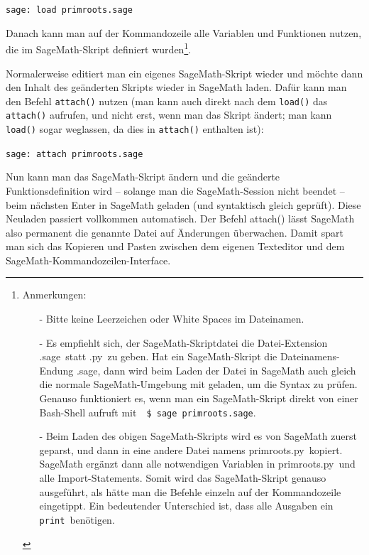 \texttt{sage: load primroots.sage}

Danach kann man auf der Kommandozeile alle Variablen und Funktionen
nutzen, die im Sage\-Math-Skript definiert wurden\footnote{%
Anmerkungen:
\begin{itemize}
\item[-]
Bitte keine Leerzeichen
oder White Spaces im Dateinamen.
\item[-]Es empfiehlt sich,
der SageMath-Skriptdatei die Datei-Extension
\glqq .sage\grqq~statt \glqq .py\grqq~zu geben.
Hat ein SageMath-Skript die Dateinamens-Endung \glqq .sage\grqq, dann wird
beim Laden der Datei in SageMath auch gleich die normale SageMath-Umgebung mit geladen,
um die Syntax zu prüfen. Genauso funktioniert es, wenn man ein SageMath-Skript direkt
von einer Bash-Shell aufruft mit~~\texttt{\$ sage primroots.sage}.
\item[-]Beim Laden des obigen
SageMath-Skripts wird es von SageMath zuerst geparst, und dann
in eine andere Datei namens \glqq primroots.py\grqq~kopiert. SageMath ergänzt
dann alle notwendigen Variablen in \glqq primroots.py\grqq~und alle Import-Statements.
Somit wird das SageMath-Skript genauso ausgeführt, als hätte man die Befehle einzeln
auf der Kommandozeile eingetippt. Ein bedeutender Unterschied ist,
dass alle Ausgaben ein \verb!print!~benötigen.
\end{itemize}
}.

Normalerweise editiert man ein eigenes SageMath-Skript wieder und möchte dann den
Inhalt des geänderten Skripts wieder in SageMath laden. Dafür kann man den Befehl
\verb!attach()! nutzen (man kann auch direkt nach dem \verb!load()!
das \verb!attach()! aufrufen, und nicht erst, wenn man das Skript ändert;
man kann \verb!load()! sogar weglassen, da dies in \verb!attach()! enthalten ist):

\texttt{sage: attach primroots.sage}

Nun kann man das SageMath-Skript ändern und die geänderte Funktionsdefinition
wird -- solange man die SageMath-Session nicht beendet -- beim nächsten Enter
in SageMath geladen (und syntaktisch gleich geprüft). Diese Neuladen passiert
vollkommen automatisch. Der Befehl attach() lässt SageMath also permanent die
genannte Datei auf Änderungen überwachen. Damit spart man sich das Kopieren
und Pasten zwischen dem eigenen Texteditor und dem SageMath-Kommandozeilen-Interface.

